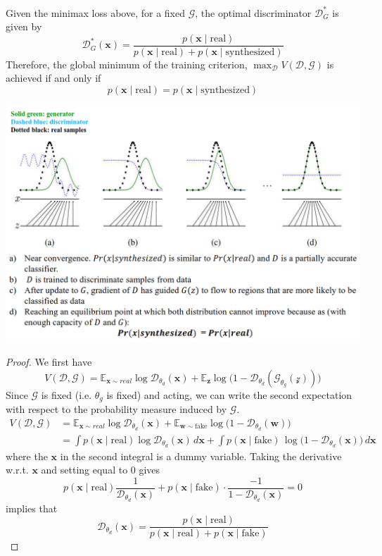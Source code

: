 \documentclass{article}
\begin{document}
  \begin{theorem} 
  Given the minimax loss above, for a fixed $\mathcal{G}$, the optimal discriminator $\mathcal{D}_G^\ast$ is given by 
  \[\mathcal{D}_G^\ast (\mathbf{x}) = \frac{p(\mathbf{x} \mid \text{real})}{p(\mathbf{x} \mid \text{real}) + p(\mathbf{x} \mid \text{synthesized})}\]
  Therefore, the global minimum of the training criterion, $\max_{\mathcal{D}} V(\mathcal{D}, \mathcal{G})$ is achieved if and only if 
  \[p(\mathbf{x} \mid \text{real}) = p(\mathbf{x} \mid \text{synthesized})\]
  \begin{center}
      \includegraphics[scale=0.4]{img/09_GAN/nash_equilibrium.png}
  \end{center}
  \end{theorem}
  \begin{proof} 
  We first have 
  \[V(\mathcal{D}, \mathcal{G}) = \mathbb{E}_{\mathbf{x} \sim real} \log \mathcal{D}_{\theta_d} (\mathbf{x}) + \mathbb{E}_{\mathbf{z}} \log \big( 1 - \mathcal{D}_{\theta_d} (\mathcal{G}_{\theta_g} (\mathcal{z}))\big) \]
  Since $\mathcal{G}$ is fixed (i.e. $\theta_g$ is fixed) and acting, we can write the second expectation with respect to the probability measure induced by $\mathcal{G}$.
  \begin{align*} 
  V(\mathcal{D}, \mathcal{G}) & = \mathbb{E}_{\mathbf{x} \sim real} \log \mathcal{D}_{\theta_d} (\mathbf{x}) + \mathbb{E}_{\mathbf{w} \sim \text{fake}} \log \big( 1 - \mathcal{D}_{\theta_d} (\mathbf{w}) \big) \\   
                                  & = \int p(\mathbf{x} \mid \text{real}) \log \mathcal{D}_{\theta_d}(\mathbf{x}) \,d\mathbf{x}+ \int p(\mathbf{x} \mid \text{fake}) \, \log \big( 1 - \mathcal{D}_{\theta_d} (\mathbf{x}) \big) \,d\mathbf{x} 
  \end{align*}
  where the $\mathbf{x}$ in the second integral is a dummy variable. Taking the derivative w.r.t. $\mathbf{x}$ and setting equal to $0$ gives 
  \[p(\mathbf{x} \mid \text{real}) \frac{1}{\mathcal{D}_{\theta_d} (\mathbf{x})} + p(\mathbf{x} \mid \text{fake}) \cdot \frac{-1}{1 - \mathcal{D}_{\theta_d}(\mathbf{x})} = 0\]
  implies that 
  \[\mathcal{D}_{\theta_d}( \mathbf{x}) = \frac{p(\mathbf{x} \mid \text{real})}{p(\mathbf{x} \mid \text{real}) + p(\mathbf{x} \mid \text{fake})}\]
  \end{proof} 
\end{document}
